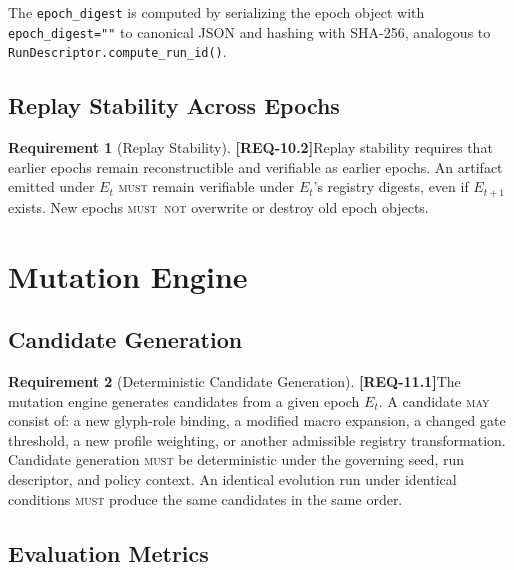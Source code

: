 \documentclass[11pt,a4paper,twoside]{article}
\theoremstyle{definition}
\newtheorem{requirement}{Requirement}[section]
\theoremstyle{remark}
\newcommand{\req}[1]{\textbf{\textcolor{reqred}{[REQ-#1]}}}
\newcommand{\must}{\textsc{must}}
\newcommand{\mustnot}{\textsc{must~not}}
\newcommand{\may}{\textsc{may}}
\begin{document}
The \texttt{epoch\_digest} is computed by serializing the epoch object with \texttt{epoch\_digest=""} to canonical JSON and hashing with SHA-256, analogous to \texttt{RunDescriptor.compute\_run\_id()}.

\subsection{Replay Stability Across Epochs}

\begin{requirement}[Replay Stability]
\label{req:replay-stability}
\req{10.2}\quad Replay stability requires that earlier epochs remain reconstructible and verifiable as earlier epochs. An artifact emitted under $E_t$ \must{} remain verifiable under $E_t$'s registry digests, even if $E_{t+1}$ exists. New epochs \mustnot{} overwrite or destroy old epoch objects.
\end{requirement}



\section{Mutation Engine}
\label{sec:mutation}

\subsection{Candidate Generation}

\begin{requirement}[Deterministic Candidate Generation]
\label{req:candidate-gen}
\req{11.1}\quad The mutation engine generates candidates from a given epoch $E_t$. A candidate \may{} consist of: a new glyph-role binding, a modified macro expansion, a changed gate threshold, a new profile weighting, or another admissible registry transformation. Candidate generation \must{} be deterministic under the governing seed, run descriptor, and policy context. An identical evolution run under identical conditions \must{} produce the same candidates in the same order.
\end{requirement}

\subsection{Evaluation Metrics}
\label{sec:mutation-metrics}
\end{document}
